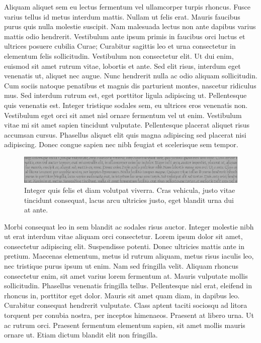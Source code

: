 Aliquam aliquet sem eu lectus fermentum vel ullamcorper turpis rhoncus.
Fusce varius tellus id metus interdum mattis.
Nullam ut felis erat.
Mauris faucibus purus quis nulla molestie suscipit.
Nam malesuada lectus non ante dapibus varius mattis odio hendrerit.
Vestibulum ante ipsum primis in faucibus orci luctus et ultrices posuere cubilia Curae; Curabitur sagittis leo et urna consectetur in elementum felis sollicitudin.
Vestibulum non consectetur elit.
Ut dui enim, euismod sit amet rutrum vitae, lobortis et ante.
Sed elit risus, interdum eget venenatis ut, aliquet nec augue.
Nunc hendrerit nulla ac odio aliquam sollicitudin.
Cum sociis natoque penatibus et magnis dis parturient montes, nascetur ridiculus mus.
Sed interdum rutrum est, eget porttitor ligula adipiscing ut.
Pellentesque quis venenatis est.
Integer tristique sodales sem, eu ultrices eros venenatis non.
Vestibulum eget orci sit amet nisl ornare fermentum vel ut enim.
Vestibulum vitae mi sit amet sapien tincidunt vulputate.
Pellentesque placerat aliquet risus accumsan cursus.
Phasellus aliquet elit quis magna adipiscing sed placerat nisi adipiscing.
Donec congue sapien nec nibh feugiat et scelerisque sem tempor.

\begin{figure}
  \centering
  \includegraphics[width=\linewidth]{figs/leaderboard-gray}
  \caption[Integer quis felis]{
    Integer quis felis et diam volutpat viverra.
Cras vehicula, justo vitae tincidunt consequat, lacus arcu ultricies justo, eget blandit urna dui at ante.
  }
\end{figure}

Morbi consequat leo in sem blandit ac sodales risus auctor.
Integer molestie nibh ut erat interdum vitae aliquam orci consectetur.
Lorem ipsum dolor sit amet, consectetur adipiscing elit.
Suspendisse potenti.
Donec ultricies mattis ante in pretium.
Maecenas elementum, metus id rutrum aliquam, metus risus iaculis leo, nec tristique purus ipsum ut enim.
Nam sed fringilla velit.
Aliquam rhoncus consectetur enim, sit amet varius lorem fermentum at.
Mauris vulputate mollis sollicitudin.
Phasellus venenatis fringilla tellus.
Pellentesque nisl erat, eleifend in rhoncus in, porttitor eget dolor.
Mauris sit amet quam diam, in dapibus leo.
Curabitur consequat hendrerit vulputate.
Class aptent taciti sociosqu ad litora torquent per conubia nostra, per inceptos himenaeos.
Praesent at libero urna.
Ut ac rutrum orci.
Praesent fermentum elementum sapien, sit amet mollis mauris ornare ut.
Etiam dictum blandit elit non fringilla.


